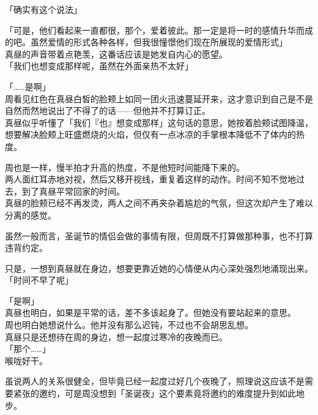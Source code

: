 「确实有这个说法」

「可是，他们看起来一直都很，那个，爱着彼此。那一定是将一时的感情升华而成的吧。虽然爱情的形式各种各样，但我很憧憬他们现在所展现的爱情形式」\\

真昼的声音带着点艳羡，这番话应该是她发自内心的愿望。\\

「我们也想变成那样呢，虽然在外面亲热不太好」

「……是啊」\\

周看见红色在真昼白皙的脸颊上如同一团火迅速蔓延开来，这才意识到自己是不是自然而然地说出了不得了的话——但他并不打算订正。\\

真昼似乎听懂了「我们『也』想变成那样」这句话的意思，她按着脸颊试图降温，想要解决脸颊上旺盛燃烧的火焰，但仅有一点冰凉的手掌根本降低不了体内的热度。

周也是一样，慢半拍才升高的热度，不是他短时间能降下来的。\\

两人面红耳赤地对视，然后又移开视线，重复着这样的动作。时间不知不觉地过去，到了真昼平常回家的时间。\\

真昼的脸颊已经不再发烫，两人之间不再夹杂着尴尬的气氛，但这次却产生了难以分离的感觉。

虽然一般而言，圣诞节的情侣会做的事情有限，但周既不打算做那种事，也不打算违背约定。

只是，一想到真昼就在身边，想要更靠近她的心情便从内心深处强烈地涌现出来。\\

「时间不早了呢」

「是啊」\\

真昼也明白，如果是平常的话，差不多该起身了。但她没有要站起来的意思。\\

周也明白她想说什么。他并没有那么迟钝，不过也不会胡思乱想。\\

真昼只是还想待在周的身边，想一起度过寒冷的夜晚而已。\\

「那个……」\\

喉咙好干。

虽说两人的关系很健全，但毕竟已经一起度过好几个夜晚了，照理说这应该不是需要紧张的邀约，可是周没想到「圣诞夜」这个要素竟将邀约的难度提升到如此地步。

